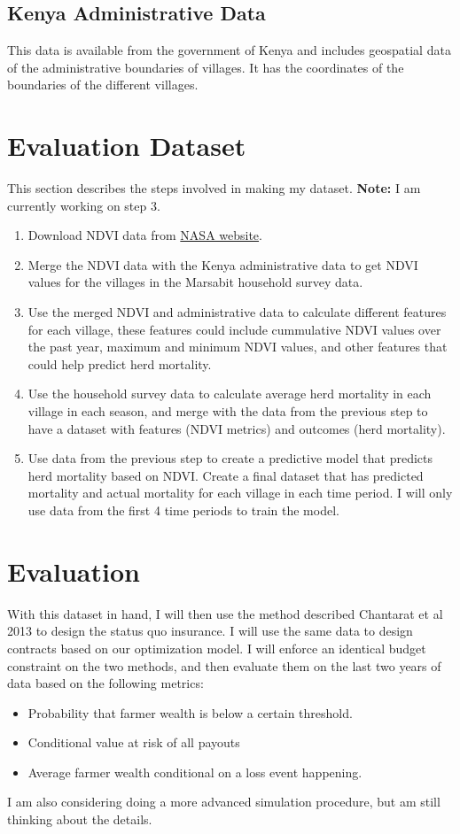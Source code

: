 \documentclass[11pt]{article}
\begin{document}
  \subsection{Kenya Administrative Data}
    This data is available from the government of Kenya and includes geospatial data of the administrative boundaries of villages. It has the coordinates of the boundaries of the different villages. 

\section{Evaluation Dataset}
  This section describes the steps involved in making my dataset. \textbf{Note:} I am currently working on step 3. 
  \begin{enumerate}
      \item Download NDVI data from \href{https://pages.stern.nyu.edu/~adamodar/New_Home_Page/datafile/wacc.html}{NASA website}.
      \item Merge the NDVI data with the Kenya administrative data to get NDVI values for the villages in the Marsabit household survey data.
      \item Use the merged NDVI and administrative data to calculate different features for each village, these features could include cummulative NDVI values over the past year, maximum and minimum NDVI values, and other features that could help predict herd mortality. 
      \item Use the household survey data to calculate average herd mortality in each village in each season, and merge with the data from the previous step to have a dataset with features (NDVI metrics) and outcomes (herd mortality). 
      \item Use data from the previous step to create a predictive model that predicts herd mortality based on NDVI. Create a final dataset that has predicted mortality and actual mortality for each village in each time period. I will only use data from the first 4 time periods to train the model.
  \end{enumerate}

\section{Evaluation}
  With this dataset in hand, I will then use the method described Chantarat et al 2013 to design the status quo insurance. I will use the same data to design contracts based on our optimization model. I will enforce an identical budget constraint on the two methods, and then evaluate them on the last two years of data based on the following metrics: 
  \begin{itemize}
      \item Probability that farmer wealth is below a certain threshold.
      \item Conditional value at risk of all payouts
      \item Average farmer wealth conditional on a loss event happening. 
  \end{itemize}

  I am also considering doing a more advanced simulation procedure, but am still thinking about the details. 
\end{document}
